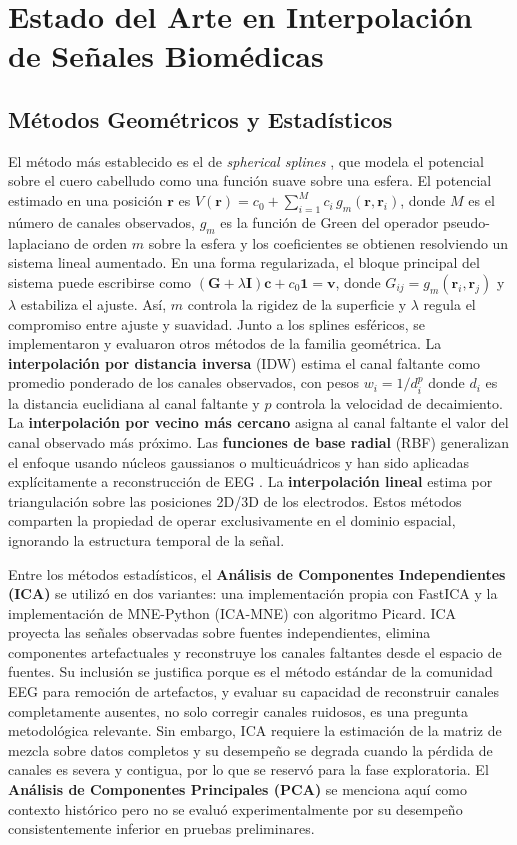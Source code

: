 \section{Estado del Arte en Interpolación de Señales Biomédicas}

\subsection{Métodos Geométricos y Estadísticos}

El método más establecido es el de \textit{spherical splines} \cite{perrin1989}, que modela el potencial sobre el cuero cabelludo como una función suave sobre una esfera. El potencial estimado en una posición $\mathbf{r}$ es $\hat{V}(\mathbf{r}) = c_0 + \sum_{i=1}^{M} c_i \, g_m(\mathbf{r}, \mathbf{r}_i)$, donde $M$ es el número de canales observados, $g_m$ es la función de Green del operador pseudo-laplaciano de orden $m$ sobre la esfera y los coeficientes se obtienen resolviendo un sistema lineal aumentado. En una forma regularizada, el bloque principal del sistema puede escribirse como $(\mathbf{G} + \lambda \mathbf{I})\mathbf{c} + c_0\mathbf{1}=\mathbf{v}$, donde $G_{ij}=g_m(\mathbf{r}_i,\mathbf{r}_j)$ y $\lambda$ estabiliza el ajuste. Así, $m$ controla la rigidez de la superficie y $\lambda$ regula el compromiso entre ajuste y suavidad.
Junto a los splines esféricos, se implementaron y evaluaron otros métodos de la familia geométrica. La \textbf{interpolación por distancia inversa} (IDW) estima el canal faltante como promedio ponderado de los canales observados, con pesos $w_i = 1/d_i^p$ donde $d_i$ es la distancia euclidiana al canal faltante y $p$ controla la velocidad de decaimiento. La \textbf{interpolación por vecino más cercano} asigna al canal faltante el valor del canal observado más próximo. Las \textbf{funciones de base radial} (RBF) generalizan el enfoque usando núcleos gaussianos o multicuádricos y han sido aplicadas explícitamente a reconstrucción de EEG \cite{jager2016rbf}. La \textbf{interpolación lineal} estima por triangulación sobre las posiciones 2D/3D de los electrodos. Estos métodos comparten la propiedad de operar exclusivamente en el dominio espacial, ignorando la estructura temporal de la señal.

Entre los métodos estadísticos, el \textbf{Análisis de Componentes Independientes (ICA)} \cite{jung2001imaging} se utilizó en dos variantes: una implementación propia con FastICA y la implementación de MNE-Python (ICA-MNE) con algoritmo Picard. ICA proyecta las señales observadas sobre fuentes independientes, elimina componentes artefactuales y reconstruye los canales faltantes desde el espacio de fuentes. Su inclusión se justifica porque es el método estándar de la comunidad EEG para remoción de artefactos, y evaluar su capacidad de reconstruir canales completamente ausentes, no solo corregir canales ruidosos, es una pregunta metodológica relevante. Sin embargo, ICA requiere la estimación de la matriz de mezcla sobre datos completos y su desempeño se degrada cuando la pérdida de canales es severa y contigua, por lo que se reservó para la fase exploratoria. El \textbf{Análisis de Componentes Principales (PCA)} se menciona aquí como contexto histórico pero no se evaluó experimentalmente por su desempeño consistentemente inferior en pruebas preliminares.
